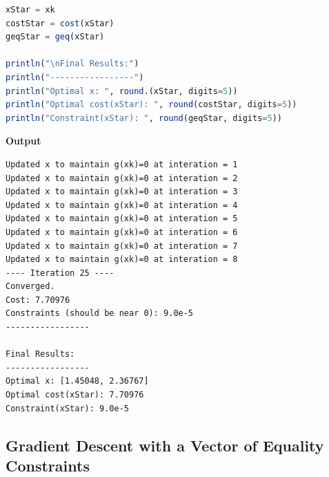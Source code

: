 \begin{lstlisting}[language=Julia,style=mystyle]
xStar = xk
costStar = cost(xStar)
geqStar = geq(xStar)

println("\nFinal Results:")
println("-----------------")
println("Optimal x: ", round.(xStar, digits=5))
println("Optimal cost(xStar): ", round(costStar, digits=5))
println("Constraint(xStar): ", round(geqStar, digits=5))

\end{lstlisting}
\textbf{Output} 
\begin{verbatim}
Updated x to maintain g(xk)=0 at interation = 1
Updated x to maintain g(xk)=0 at interation = 2
Updated x to maintain g(xk)=0 at interation = 3
Updated x to maintain g(xk)=0 at interation = 4
Updated x to maintain g(xk)=0 at interation = 5
Updated x to maintain g(xk)=0 at interation = 6
Updated x to maintain g(xk)=0 at interation = 7
Updated x to maintain g(xk)=0 at interation = 8
---- Iteration 25 ----
Converged.
Cost: 7.70976
Constraints (should be near 0): 9.0e-5
----------------- 

Final Results:
-----------------
Optimal x: [1.45048, 2.36767]
Optimal cost(xStar): 7.70976
Constraint(xStar): 9.0e-5
\end{verbatim}

\bigskip

\subsection{Gradient Descent with a Vector of Equality Constraints}

